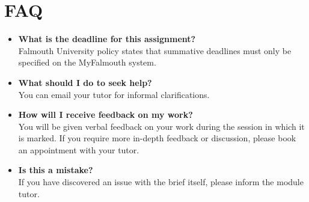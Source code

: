 \documentclass{../../fal_assignment}
\begin{document}
\section*{FAQ}

\begin{itemize}
	\item 	\textbf{What is the deadline for this assignment?} \\ 
    		Falmouth University policy states that summative deadlines must only be specified on the MyFalmouth system.
    		
	\item 	\textbf{What should I do to seek help?} \\ 
    		You can email your tutor for informal clarifications.  
    		
	\item 	\textbf{How will I receive feedback on my work?} \\ 
    		You will be given verbal feedback on your work during the session in which it is marked.
    		If you require more in-depth feedback or discussion, please book an appointment with your tutor.
    		
    	\item 	\textbf{Is this a mistake?} \\ 	
    		If you have discovered an issue with the brief itself, please inform the module tutor.
\end{itemize}
\end{document}
